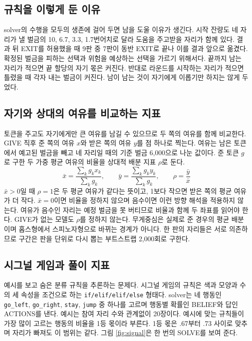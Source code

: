 \subsection{규칙을 이렇게 둔 이유}

solver의 수행을 모두의 생존에 걸어 두면 남을 도울 이유가 생긴다. 시작 잔량도 네 자리가 낼 벌금의 10, 6.7, 3.3, 1.7번어치로 달라 도움을 주고받을 자리가 함께 있다. 결과 뒤 EXIT를 허용했을 때 9판 중 7판이 동반 EXIT로 끝나 이를 결과 앞으로 옮겼다. 확정된 벌금을 피하는 선택과 위험을 예상하는 선택을 가르기 위해서다. 끝까지 남는 자리가 적으면 끝 할당의 자기 몫은 커진다. 반대로 라운드를 시작하는 자리가 적으면 틀렸을 때 각자 내는 벌금이 커진다. 남이 남는 것이 자기에게 이롭기만 하지는 않게 두었다.

\subsection{자기와 상대의 여유를 비교하는 지표}\label{sec:index}

토큰을 주고도 자기에게만 큰 여유를 남길 수 있으므로 두 쪽의 여유를 함께 비교한다. GIVE 직후 준 쪽의 여유 $x$와 받은 쪽의 여유 $y$를 점 하나로 찍는다. 여유는 남은 토큰에서 예고된 벌금을 빼고 네 자리일 때의 기준 벌금 6,000으로 나눈 값이다. 준 토큰 $g$로 구한 두 가중 평균 여유의 비율을 상대적 배분 지표 $\rho$로 둔다.
\begin{equation}
\bar{x}=\frac{\sum_k g_k x_k}{\sum_k g_k},\qquad \bar{y}=\frac{\sum_k g_k y_k}{\sum_k g_k},\qquad \rho=\frac{\bar{y}}{\bar{x}}
\label{eq:rho}
\end{equation}
$\bar{x}>0$일 때 $\rho=1$은 두 평균 여유가 같다는 뜻이고, 1보다 작으면 받은 쪽의 평균 여유가 더 작다. $\bar{x}=0$이면 비율을 정하지 않으며 음수이면 이런 방향 해석을 적용하지 않는다. 여유가 음수인 자리는 예정 벌금을 못 버티므로 비율과 함께 두 좌표를 읽어야 한다. GIVE가 없는 모델도 $\rho$를 정하지 않는다. 무게중심은 실제로 준 경우의 평균 배분이며 홉스형에서 스피노자형으로 바뀌는 경계가 아니다. 한 판의 자리들은 서로 의존하므로 구간은 판을 단위로 다시 뽑는 부트스트랩 2,000회로 구한다.

\subsection{시그널 게임과 풀이 지표}

예시를 보고 숨은 분류 규칙을 추론하는 문제다. 시그널 게임의 규칙은 색과 모양과 수의 세 속성을 조건으로 하는 \texttt{if/elif/elif/else} 형태다. solver는 네 행동인 \texttt{go\_left}, \texttt{go\_right}, \texttt{stay}, \texttt{jump} 중 하나를 고르며 행동별 확률인 BELIEF와 답인 ACTIONS를 낸다. 예시는 참여 자리 수와 관계없이 20장이다. 예시에 맞는 규칙들이 가장 많이 고르는 행동의 비율을 1등 몫이라 부른다. 1등 몫은 .67부터 .73 사이로 맞추며 자리가 빠져도 이 범위는 같다. 그림 \ref{fig:signal}은 한 번의 SOLVE를 보여 준다.

